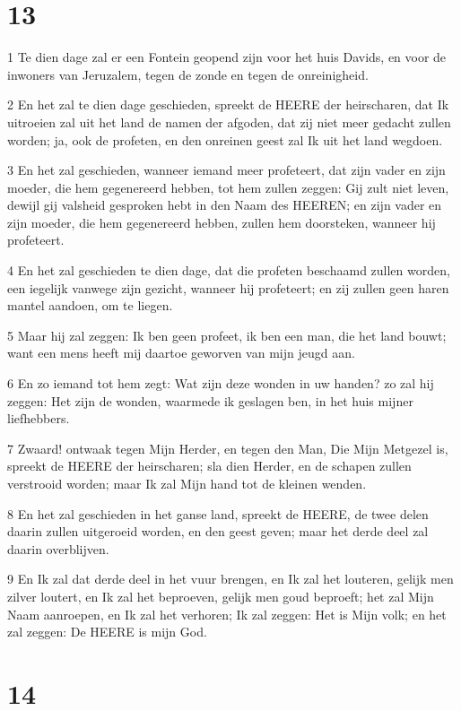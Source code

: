 \chapter{13}

\par 1 Te dien dage zal er een Fontein geopend zijn voor het huis Davids, en voor de inwoners van Jeruzalem, tegen de zonde en tegen de onreinigheid.
\par 2 En het zal te dien dage geschieden, spreekt de HEERE der heirscharen, dat Ik uitroeien zal uit het land de namen der afgoden, dat zij niet meer gedacht zullen worden; ja, ook de profeten, en den onreinen geest zal Ik uit het land wegdoen.
\par 3 En het zal geschieden, wanneer iemand meer profeteert, dat zijn vader en zijn moeder, die hem gegenereerd hebben, tot hem zullen zeggen: Gij zult niet leven, dewijl gij valsheid gesproken hebt in den Naam des HEEREN; en zijn vader en zijn moeder, die hem gegenereerd hebben, zullen hem doorsteken, wanneer hij profeteert.
\par 4 En het zal geschieden te dien dage, dat die profeten beschaamd zullen worden, een iegelijk vanwege zijn gezicht, wanneer hij profeteert; en zij zullen geen haren mantel aandoen, om te liegen.
\par 5 Maar hij zal zeggen: Ik ben geen profeet, ik ben een man, die het land bouwt; want een mens heeft mij daartoe geworven van mijn jeugd aan.
\par 6 En zo iemand tot hem zegt: Wat zijn deze wonden in uw handen? zo zal hij zeggen: Het zijn de wonden, waarmede ik geslagen ben, in het huis mijner liefhebbers.
\par 7 Zwaard! ontwaak tegen Mijn Herder, en tegen den Man, Die Mijn Metgezel is, spreekt de HEERE der heirscharen; sla dien Herder, en de schapen zullen verstrooid worden; maar Ik zal Mijn hand tot de kleinen wenden.
\par 8 En het zal geschieden in het ganse land, spreekt de HEERE, de twee delen daarin zullen uitgeroeid worden, en den geest geven; maar het derde deel zal daarin overblijven.
\par 9 En Ik zal dat derde deel in het vuur brengen, en Ik zal het louteren, gelijk men zilver loutert, en Ik zal het beproeven, gelijk men goud beproeft; het zal Mijn Naam aanroepen, en Ik zal het verhoren; Ik zal zeggen: Het is Mijn volk; en het zal zeggen: De HEERE is mijn God.

\chapter{14}

